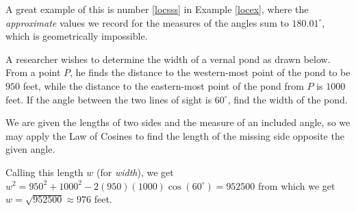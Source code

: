 \documentclass{ximera}
\begin{document}
 

A great example of this is number   \ref{locsss} in  Example \ref{locex}, where the \textit{approximate} values we record for the measures of the angles sum to $180.01^{\circ}$, which is geometrically impossible. 
 

\begin{example}  \label{locapplication}  A researcher wishes to determine the width of a vernal pond as drawn below. From a point $P$, he finds the distance to the western-most point of the pond to be $950$ feet, while the distance to the eastern-most point of the pond from $P$ is $1000$ feet. If the angle between the two lines of sight is $60^{\circ}$, find the width of the pond.

\begin{image}
\end{image}

\begin{explanation} We are given the lengths of two sides and the measure of an included angle, so we may apply the Law of Cosines to find the length of the missing side opposite the given angle. 

 

 Calling this length $w$ (for \textit{width}), we get  $w^2 = 950^2 + 1000^2 - 2(950)(1000)\cos\left(60^{\circ}\right) = 952500$ from which we get $w = \sqrt{952500} \approx 976$ feet.  

\end{explanation}
\end{example}
\end{document}
